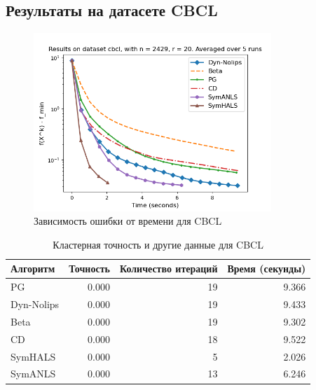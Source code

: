 \documentclass[a4paper,11pt]{article}
\begin{document}
\subsection{Результаты на датасете CBCL}
\begin{figure}[h!]
    \centering \includegraphics[width=0.8\textwidth]{my_plot_cbcl.png}
    \caption{Зависимость ошибки от времени для CBCL}
    \label{fig:cbcl}
\end{figure}
\begin{table}[h!]
    \centering
    \caption{Кластерная точность и другие данные для CBCL}
    \label{tab:clustering_accuracy_cbcl}
    \begin{tabular}{|l|r|r|r|}
        \hline
        Алгоритм & Точность & Количество итераций & Время (секунды) \\
        \hline
        PG & 0.000 & 19 & 9.366 \\
        Dyn-Nolips & 0.000 & 19 & 9.433 \\
        Beta & 0.000 & 19 & 9.302 \\
        CD & 0.000 & 18 & 9.522 \\
        SymHALS & 0.000 & 5 & 2.026 \\
        SymANLS & 0.000 & 13 & 6.246 \\
        \hline
    \end{tabular}
\end{table}
\newpage
\end{document}
